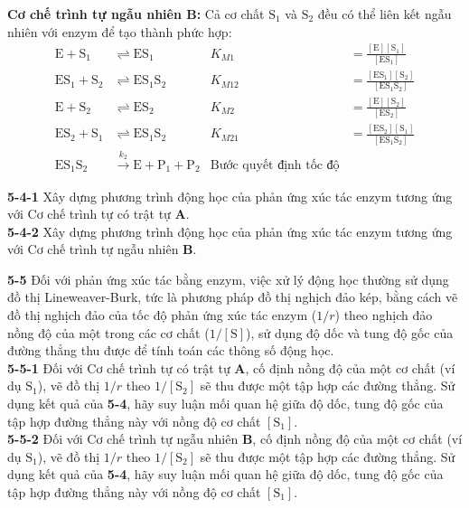 \noindent
\textbf{Cơ chế trình tự ngẫu nhiên B:} Cả cơ chất $\mathrm{S_1}$ và $\mathrm{S_2}$ đều có thể liên kết ngẫu nhiên với enzym để tạo thành phức hợp:
\begin{align*}
    \mathrm{E} + \mathrm{S_1} &\rightleftharpoons \mathrm{ES_1} & K_{M1} &= \frac{[\mathrm{E}][\mathrm{S_1}]}{[\mathrm{ES_1}]} \\
    \mathrm{ES_1} + \mathrm{S_2} &\rightleftharpoons \mathrm{ES_1S_2} & K_{M12} &= \frac{[\mathrm{ES_1}][\mathrm{S_2}]}{[\mathrm{ES_1S_2}]} \\
    \mathrm{E} + \mathrm{S_2} &\rightleftharpoons \mathrm{ES_2} & K_{M2} &= \frac{[\mathrm{E}][\mathrm{S_2}]}{[\mathrm{ES_2}]} \\
    \mathrm{ES_2} + \mathrm{S_1} &\rightleftharpoons \mathrm{ES_1S_2} & K_{M21} &= \frac{[\mathrm{ES_2}][\mathrm{S_1}]}{[\mathrm{ES_1S_2}]} \\
    \mathrm{ES_1S_2} &\xrightarrow{k_2} \mathrm{E} + \mathrm{P_1} + \mathrm{P_2} & \text{Bước quyết định tốc độ}
\end{align*}

\vspace{0.2cm}

\noindent
\textbf{5-4-1} Xây dựng phương trình động học của phản ứng xúc tác enzym tương ứng với Cơ chế trình tự có trật tự \textbf{A}. \\
\textbf{5-4-2} Xây dựng phương trình động học của phản ứng xúc tác enzym tương ứng với Cơ chế trình tự ngẫu nhiên \textbf{B}.

\vspace{0.2cm}

\noindent
\textbf{5-5} Đối với phản ứng xúc tác bằng enzym, việc xử lý động học thường sử dụng đồ thị Lineweaver-Burk, tức là phương pháp đồ thị nghịch đảo kép, bằng cách vẽ đồ thị nghịch đảo của tốc độ phản ứng xúc tác enzym ($1/r$) theo nghịch đảo nồng độ của một trong các cơ chất ($1/[\mathrm{S}]$), sử dụng độ dốc và tung độ gốc của đường thẳng thu được để tính toán các thông số động học. \\
\textbf{5-5-1} Đối với Cơ chế trình tự có trật tự \textbf{A}, cố định nồng độ của một cơ chất (ví dụ $\mathrm{S_1}$), vẽ đồ thị $1/r$ theo $1/[\mathrm{S_2}]$ sẽ thu được một tập hợp các đường thẳng. Sử dụng kết quả của \textbf{5-4}, hãy suy luận mối quan hệ giữa độ dốc, tung độ gốc của tập hợp đường thẳng này với nồng độ cơ chất $[\mathrm{S_1}]$. \\
\textbf{5-5-2} Đối với Cơ chế trình tự ngẫu nhiên \textbf{B}, cố định nồng độ của một cơ chất (ví dụ $\mathrm{S_1}$), vẽ đồ thị $1/r$ theo $1/[\mathrm{S_2}]$ sẽ thu được một tập hợp các đường thẳng. Sử dụng kết quả của \textbf{5-4}, hãy suy luận mối quan hệ giữa độ dốc, tung độ gốc của tập hợp đường thẳng này với nồng độ cơ chất $[\mathrm{S_1}]$.

